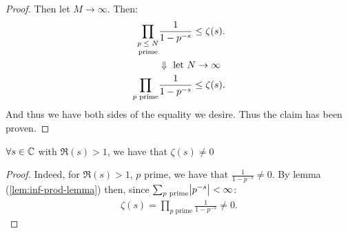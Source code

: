 \begin{proof}
Then let $M \to \infty$. Then:
\begin{align*}
    \prod_{\text{\stackanchor{$p \leq N$}{prime}}} &\frac{1}{1-p^{-s}} \leq \zeta(s).\\
    &\Downarrow \text{ let $N \to \infty$}\\
    \prod_{p \text{ prime}} &\frac{1}{1-p^{-s}} \leq \zeta(s).
\end{align*}
And thus we have both sides of the equality we desire. Thus the claim has been proven.

\end{proof}

\begin{corollary}\label{cor:r-pos-strip-non-zero}
$\forall s \in \mathbb{C}$ with $\Re(s) > 1$, we have that $\zeta(s) \neq 0$
\end{corollary}
\begin{proof}
Indeed, for $\Re(s) > 1$, $p$ prime, we have that $\frac{1}{1-p^{-s}} \neq 0$. By lemma (\ref{lem:inf-prod-lemma}) then, since $\sum_{p \text{ prime}} \abs{p^{-s} } < \infty$:
\begin{align*}
    \zeta(s) = \prod_{p \text{ prime}} \frac{1}{1-p^{-s}} \neq 0.
\end{align*}
\end{proof}


